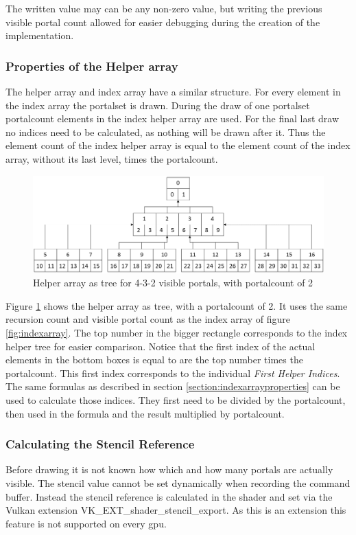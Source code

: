 The written value may can be any non-zero value, but writing the previous visible portal count allowed for easier debugging during the creation of the implementation.

\subsubsection{Properties of the Helper array}
\label{section:helperarrayproperties}
The helper array and index array have a similar structure. For every element in the index array the \gls{portalset} is drawn. During the draw of one \gls{portalset} \gls{portalcount} elements in the index helper array are used. For the final last draw no indices need to be calculated, as nothing will be drawn after it. Thus the element count of the index helper array is equal to the element count of the index array, without its last level, times the \gls{portalcount}.

\begin{figure}[h]
	\includegraphics[width=\linewidth]{images/helperarray.png}
	\caption{Helper array as tree for 4-3-2 visible portals, with \gls{portalcount} of 2}
	\label{fig:helperarray}
\end{figure}

Figure \ref{fig:helperarray} shows the helper array as tree, with a \gls{portalcount} of 2. It uses the same recursion count and visible portal count as the index array of figure \ref{fig:indexarray}. The top number in the bigger rectangle corresponds to the index helper tree for easier comparison. Notice that the first index of the actual elements in the bottom boxes is equal to are the top number times the \gls{portalcount}. This first index corresponds to the individual \textit{First Helper Indices}. The same formulas as described in section \ref{section:indexarrayproperties} can be used to calculate those indices. They first need to be divided by the \gls{portalcount}, then used in the formula and the result multiplied by \gls{portalcount}.


\subsubsection{Calculating the Stencil Reference}
Before drawing it is not known how which and how many portals are actually visible. The stencil value cannot be set dynamically when recording the command buffer. Instead the stencil reference is calculated in the shader and set via the Vulkan extension VK\_EXT\_shader\_stencil\_export. As this is an extension this feature is not supported on every \gls{gpu}.

